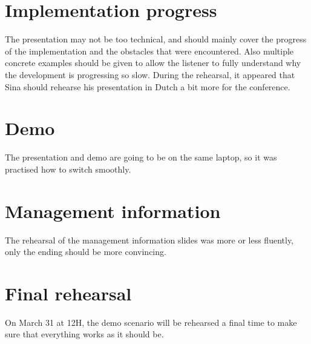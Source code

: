 \documentclass[a4paper, 12pt]{article}
\begin{document}
\section{Implementation progress}

The presentation may not be too technical, and should mainly cover the progress of the implementation and the obstacles that were encountered. Also multiple concrete examples should be given to allow the listener to fully understand why the development is progressing so slow. During the rehearsal, it appeared that Sina should rehearse his presentation in Dutch a bit more for the conference.

\section{Demo}

The presentation and demo are going to be on the same laptop, so it was practised how to switch smoothly. 


\section{Management information}

The rehearsal of the management information slides was more or less fluently, only the ending should be more convincing. 


\section{Final rehearsal}

On March 31 at 12H, the demo scenario will be rehearsed a final time to make sure that everything works as it should be. 



		
\end{document}
